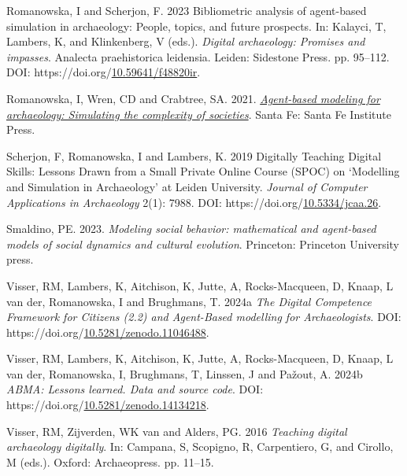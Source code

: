 \documentclass[
]{article}
\newlength{\cslhangindent}
\newlength{\cslentryspacingunit} %
\newenvironment{CSLReferences}[2] %
 {%
  \setlength{\parindent}{0pt}
  \ifodd #1
  \let\oldpar\par
  \def\par{\hangindent=\cslhangindent\oldpar}
  \fi
  \setlength{\parskip}{#2\cslentryspacingunit}
 }%
 {}
\begin{document}
\begin{CSLReferences}{1}{0}
\leavevmode{}%
Romanowska, I and Scherjon, F. 2023 Bibliometric analysis of agent-based simulation in archaeology: People, topics, and future prospects. In: Kalayci, T, Lambers, K, and Klinkenberg, V (eds.). \emph{Digital archaeology: Promises and impasses}. Analecta praehistorica leidensia. Leiden: Sidestone Press. pp. 95--112. DOI: https://doi.org/\href{https://doi.org/10.59641/f48820ir}{10.59641/f48820ir}.

\leavevmode{}%
Romanowska, I, Wren, CD and Crabtree, SA. 2021. \emph{\href{https://www.sfipress.org/books/agent-based-modeling-archaeology}{Agent-based modeling for archaeology: Simulating the complexity of societies}}. Santa Fe: Santa Fe Institute Press.

\leavevmode{}%
Scherjon, F, Romanowska, I and Lambers, K. 2019 Digitally Teaching Digital Skills: Lessons Drawn from a Small Private Online Course (SPOC) on {`}Modelling and Simulation in Archaeology{'} at Leiden University. \emph{Journal of Computer Applications in Archaeology} 2(1): 7988. DOI: https://doi.org/\href{https://doi.org/10.5334/jcaa.26}{10.5334/jcaa.26}.

\leavevmode{}%
Smaldino, PE. 2023. \emph{Modeling social behavior: mathematical and agent-based models of social dynamics and cultural evolution}. Princeton: Princeton University press.

\leavevmode{}%
Visser, RM, Lambers, K, Aitchison, K, Jutte, A, Rocks-Macqueen, D, Knaap, L van der, Romanowska, I and Brughmans, T. 2024a \emph{The Digital Competence Framework for Citizens (2.2) and Agent-Based modelling for Archaeologists}. DOI: https://doi.org/\href{https://doi.org/10.5281/zenodo.11046488}{10.5281/zenodo.11046488}.

\leavevmode{}%
Visser, RM, Lambers, K, Aitchison, K, Jutte, A, Rocks-Macqueen, D, Knaap, L van der, Romanowska, I, Brughmans, T, Linssen, J and Pažout, A. 2024b \emph{ABMA: Lessons learned. Data and source code}. DOI: https://doi.org/\href{https://doi.org/10.5281/zenodo.14134218}{10.5281/zenodo.14134218}.

\leavevmode{}%
Visser, RM, Zijverden, WK van and Alders, PG. 2016 \emph{Teaching digital archaeology digitally}. In: Campana, S, Scopigno, R, Carpentiero, G, and Cirollo, M (eds.). Oxford: Archaeopress. pp. 11--15.


\end{CSLReferences}
\end{document}
